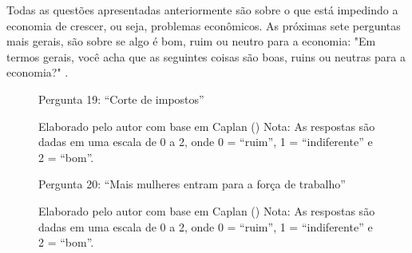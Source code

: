 Todas as questões apresentadas anteriormente são sobre o que está impedindo a economia de crescer, ou seja, problemas econômicos. As próximas sete perguntas mais gerais, são sobre se algo é bom, ruim ou neutro para a economia: "Em termos gerais, você acha que as seguintes coisas são boas, ruins ou neutras para a economia?" \cite{saee1996}.

\begin{figure}[H]
    \centering
    \caption*{Pergunta 19: “Corte de impostos”}
    \caption{Elaborado pelo autor com base em Caplan (\citeyear{The_Myth_of_the_Rational_Voter}) \newline
    Nota: As respostas são dadas em uma escala de 0 a 2, onde 0 = “ruim”, 1 = “indiferente” e 2 = “bom”.}
    \label{fig:pergunta_19}
\end{figure}

\begin{figure}[H]
    \centering
    \caption*{Pergunta 20: “Mais mulheres entram para a força de trabalho”}
    \caption{Elaborado pelo autor com base em Caplan (\citeyear{The_Myth_of_the_Rational_Voter}) \newline
    Nota: As respostas são dadas em uma escala de 0 a 2, onde 0 = “ruim”, 1 = “indiferente” e 2 = “bom”.}
    \label{fig:pergunta_20}
\end{figure}


